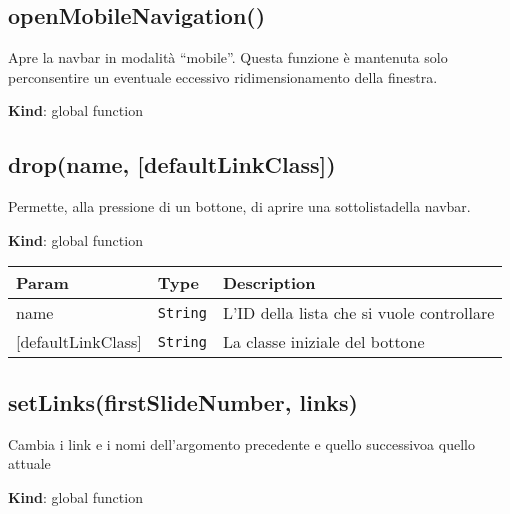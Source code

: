 \protect\hypertarget{openMobileNavigation}{}{}

\hypertarget{openmobilenavigation}{%
\subsection{openMobileNavigation()}\label{openmobilenavigation}}

Apre la navbar in modalità ``mobile''. Questa funzione è mantenuta solo
perconsentire un eventuale eccessivo ridimensionamento della finestra.

\textbf{Kind}: global function\\
\protect\hypertarget{drop}{}{}

\hypertarget{dropname-defaultlinkclass}{%
\subsection{drop(name,
{[}defaultLinkClass{]})}\label{dropname-defaultlinkclass}}

Permette, alla pressione di un bottone, di aprire una sottolistadella
navbar.

\textbf{Kind}: global function

\begin{tabularx}{\textwidth}{XXX}
\toprule
Param & Type & Description\tabularnewline
\midrule
\endhead
name & \texttt{String} & L'ID della lista che si vuole
controllare\tabularnewline
{[}defaultLinkClass{]} & \texttt{String} & La classe iniziale del
bottone\tabularnewline
\bottomrule
\end{tabularx}

\protect\hypertarget{setLinks}{}{}

\hypertarget{setlinksfirstslidenumber-links}{%
\subsection{setLinks(firstSlideNumber,
links)}\label{setlinksfirstslidenumber-links}}

Cambia i link e i nomi dell'argomento precedente e quello successivoa
quello attuale

\textbf{Kind}: global function

